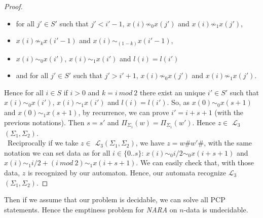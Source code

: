 \documentclass[a4paper,10pt]{report}
\newcommand{\Lt}{$\mathcal{L}_{3}$}
\newcommand{\ses}{\{0..s\}}
\begin{document}
\begin{proof}
    \begin{itemize}
      \item for all $j' \in S'$ such that $j'< i' - 1$, $x(i) \not \sim_0 x(j')$ and $x(i) \not \sim_1 x(j')$,
      \item $x(i) \not \sim_k x(i' -1)$ and $x(i) \sim_{(1-k)} x(i' -1)$,
      \item $x(i) \sim_0 x(i')$, $x(i) \sim_1 x(i')$ and $l(i) = l(i')$
      \item and for all $j' \in S'$ such that $j'> i' + 1$, $x(i) \not \sim_0 x(j')$ and $x(i) \not \sim_1 x(j')$.
    \end{itemize}
    Hence for all $i \in S$ if $i > 0$ and $k = i\ mod\  2$ there exist an unique $i' \in S'$ such that $x(i) \sim_0 x(i')$, $x(i) \sim_1 x(i')$ and $l(i) = l(i')$.
    So, as $x(0) \sim_0 x(s+1)$ and  $x(0) \sim_1 x(s+1)$, by recurrence, we can prove $i' = i + s +1$ (with the previous notations).
    Then $s= s'$ and $\Pi_{\Sigma_1}(w) = \Pi_{\Sigma_1}(w')$.
    Hence $z \in$ \Lt$(\Sigma_1,\Sigma_2)$. \\\
    Reciprocally if we take $z \in$ \Lt$(\Sigma_1,\Sigma_2)$, we have $z = w\#w'\#$, with the same notation we can set data as for all $i \in \ses$:
    $x(i) \sim_0 i / 2 \sim_0 x(i+s+1)$ and $x(i) \sim_1 i/2 + (i\ mod \ 2) \sim_1 x(i+s+1)$. We can easily check that, with those data, $z$ is recognized by our automaton. 
    Hence, our automata recognize \Lt$(\Sigma_1,\Sigma_2)$. 
  
  \end{proof}
  Then if we assume that our problem is decidable, we can solve all PCP statements.
  Hence the emptiness problem for \textit{NARA} on $n$-data is undecidable.
  
\end{document}

